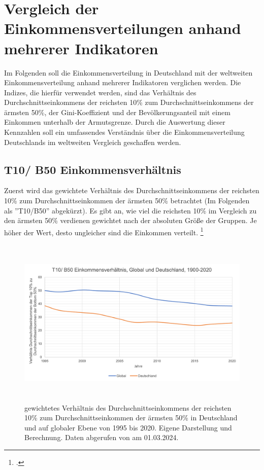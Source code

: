 \chapter{Vergleich der Einkommensverteilungen anhand mehrerer Indikatoren}

Im Folgenden soll die Einkommensverteilung in Deutschland mit der weltweiten Einkommensverteilung anhand mehrerer Indikatoren verglichen werden. Die Indizes, die hierfür verwendet werden, sind das Verhältnis des Durchschnittseinkommens der reichsten 10\% zum Durchschnittseinkommens der ärmsten 50\%, der Gini-Koeffizient und der Bevölkerungsanteil mit einem Einkommen unterhalb der Armutsgrenze. Durch die Auswertung dieser Kennzahlen soll ein umfassendes Verständnis über die Einkommensverteilung Deutschlands im weltweiten Vergleich geschaffen werden.
\section{T10/ B50 Einkommensverhältnis}

Zuerst wird das gewichtete Verhältnis des Durchschnittseinkommens der reichsten 10\% zum Durchschnittseinkommen der ärmsten 50\% betrachtet (Im Folgenden als ''T10/B50'' abgekürzt). Es gibt an, wie viel die reichsten 10\% im Vergleich zu den ärmsten 50\% verdienen gewichtet nach der absoluten Grö{\ss}e der Gruppen. Je höher der Wert, desto ungleicher sind die Einkommen verteilt. \footcite[Vgl.][S. 31]{wir_2022}

\begin{figure}[H]
    \centering
    \includegraphics[height=8.15cm]{Bilder/T10:B50-Ratio2.png}
    \caption[T10/B50-Verhältnis, Deutschland und global, 1995-2020]{gewichtetes Verhältnis des Durchschnittseinkommens der reichsten 10\% zum Durchschnittseinkommen der ärmsten 50\% in Deutschland und auf globaler Ebene von 1995 bis 2020. Eigene Darstellung und Berechnung. Daten abgerufen von \cite[][, S.55, 195]{wir_2022} am 01.03.2024.}
    \label{fig:iso_norm}
\end{figure}

